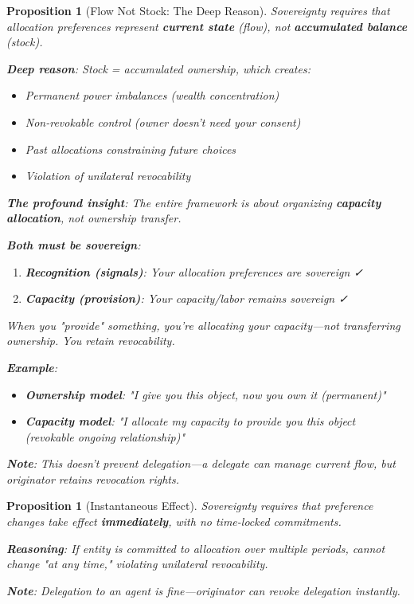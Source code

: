 \documentclass[11pt,a4paper]{article}
\newtheorem{proposition}[theorem]{Proposition}
\theoremstyle{definition}
\theoremstyle{remark}
\begin{document}
\begin{proposition}[Flow Not Stock: The Deep Reason]
Sovereignty requires that allocation preferences represent \textbf{current state} (flow), not \textbf{accumulated balance} (stock).

\textbf{Deep reason}: Stock = accumulated ownership, which creates:
\begin{itemize}
\item Permanent power imbalances (wealth concentration)
\item Non-revokable control (owner doesn't need your consent)
\item Past allocations constraining future choices
\item Violation of unilateral revocability
\end{itemize}

\textbf{The profound insight}: The entire framework is about organizing \textbf{capacity allocation}, not ownership transfer.

\textbf{Both must be sovereign}:
\begin{enumerate}
\item \textbf{Recognition (signals)}: Your allocation preferences are sovereign ✓
\item \textbf{Capacity (provision)}: Your capacity/labor remains sovereign ✓
\end{enumerate}

When you "provide" something, you're allocating your capacity—not transferring ownership. You retain revocability.

\textbf{Example}: 
\begin{itemize}
\item \textbf{Ownership model}: "I give you this object, now you own it (permanent)"
\item \textbf{Capacity model}: "I allocate my capacity to provide you this object (revokable ongoing relationship)"
\end{itemize}

\textbf{Note}: This doesn't prevent delegation—a delegate can manage current flow, but originator retains revocation rights.
\end{proposition}

\begin{proposition}[Instantaneous Effect]
Sovereignty requires that preference changes take effect \textbf{immediately}, with no time-locked commitments.

\textbf{Reasoning}: If entity is committed to allocation over multiple periods, cannot change "at any time," violating unilateral revocability.

\textbf{Note}: Delegation to an agent is fine—originator can revoke delegation instantly.
\end{proposition}
\end{document}
